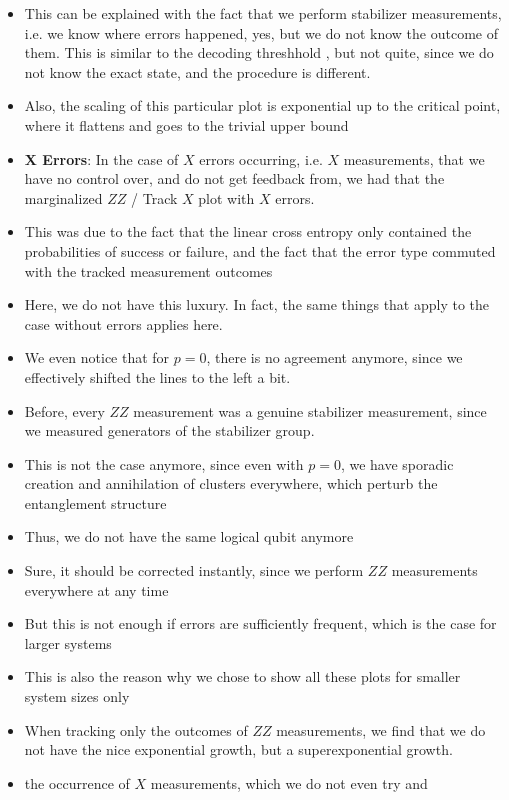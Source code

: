 \begin{itemize}
  \item This can be explained with the fact that we perform stabilizer
    measurements, i.e. we know where errors happened, yes, but we do not know
    the outcome of them. This is similar to the decoding threshhold
    \cite{roserDecodingProjectiveTransverse2023}, but not quite, since we do
    not know the exact state, and the procedure is different.
  \item Also, the scaling of this particular plot is exponential up to the
    critical point, where it flattens and goes to the trivial upper bound
  \item \textbf{X Errors}: In the case of $X$ errors occurring, i.e. $X$
    measurements, that we have no control over, and do not get feedback from,
    we had that the marginalized $ZZ$ / Track $X$ plot with $X$ errors.
  \item This was due to the fact that the linear cross entropy only contained
    the probabilities of success or failure, and the fact that the error type
    commuted with the tracked measurement outcomes
  \item Here, we do not have this luxury. In fact, the same things that apply
    to the case without errors applies here.
  \item We even notice that for $p=0$, there is no agreement anymore, since we
    effectively shifted the lines to the left a bit.
  \item Before, every $ZZ$ measurement was a genuine stabilizer measurement,
    since we measured generators of the stabilizer group. 
  \item This is not the case anymore, since even with $p=0$, we have sporadic
    creation and annihilation of clusters everywhere, which perturb the
    entanglement structure
  \item Thus, we do not have the same logical qubit anymore
  \item Sure, it should be corrected instantly, since we perform $ZZ$
    measurements everywhere at any time
  \item But this is not enough if errors are sufficiently frequent, which is
    the case for larger systems
  \item This is also the reason why we chose to show all these plots for
    smaller system sizes only
  \item When tracking only the outcomes of $ZZ$ measurements, we find that we
    do not have the nice exponential growth, but a superexponential growth.
  \item the occurrence of $X$ measurements, which we do not even try and

\end{itemize}

